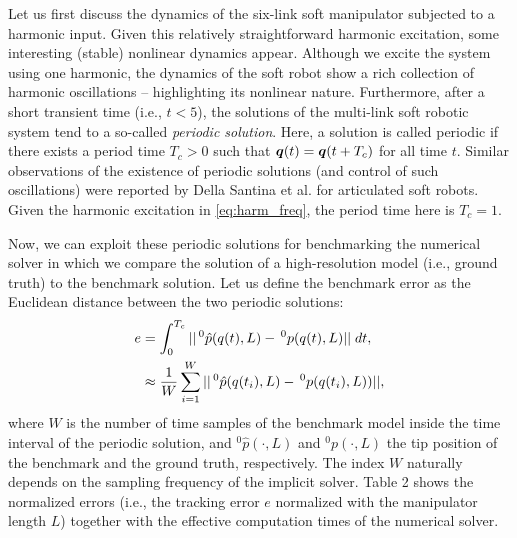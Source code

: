 Let us first discuss the dynamics of the six-link soft manipulator subjected to a harmonic input. Given this relatively straightforward harmonic excitation, some interesting (stable) nonlinear dynamics appear. Although we excite the system using one harmonic, the dynamics of the soft robot show a rich collection of harmonic oscillations -- highlighting its nonlinear nature. Furthermore, after a short transient time (i.e., $t < 5$), the solutions of the multi-link soft robotic system tend to a so-called \emph{periodic solution}. Here, a solution is called periodic if there exists a period time $T_c >  0$ such that ${\boldsymbol{q}}(t) = {\boldsymbol{q}}(t + T_c)$ for all time $t$. Similar observations of the existence of periodic solutions (and control of such oscillations) were reported by Della Santina et al. \cite{Santina2021} for articulated soft robots. Given the harmonic excitation in \eqref{eq:harm_freq}, the period time here is $T_c = 1$.

Now, we can exploit these periodic solutions for benchmarking the numerical solver in which we compare the solution of a high-resolution model (i.e., ground truth) to the benchmark solution. Let us define the benchmark error as the Euclidean distance between the two periodic solutions:
%
\begin{align}
e & = \int^{T_c}_0 || \,^0\hat{p}(q(t),L) - \,^0p(q(t),L) || \; dt, \notag \\ & \approx \frac{1}{W}\sum_{i = 1}^{W} || \,^0\hat{p}(q(t_i),L) - \,^0p(q(t_i),L)) ||,
\end{align}
%
where $W$ is the number of time samples of the benchmark model inside the time interval of the periodic solution, and $^0\hat{p}(\cdot,L)$ and $^0p(\cdot,L)$ the tip position of the benchmark and the ground truth, respectively. The index $W$ naturally depends on the sampling frequency of the implicit solver. Table 2 shows the normalized errors (i.e., the tracking error $e$ normalized with the manipulator length $L$) together with the effective computation times of the numerical solver.
\clearpage


